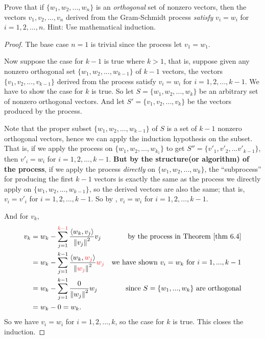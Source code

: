 \begin{exercise} \label{exercise 6.2.8}
Prove that if \(\{ w_1, w_2, ..., w_n \}\) is an \emph{orthogonal} set of nonzero vectors, then the vectors \(v_1, v_2, ..., v_n\) derived from the Gram-Schmidt process \emph{satisfy} \(v_i = w_i\) for \(i = 1, 2, ..., n\).
Hint: Use mathematical induction.
\end{exercise}

\begin{proof}
The base case \(n = 1\) is trivial since the process let \(v_1 = w_1\).

Now suppose the case for \(k - 1\) is true where \(k > 1\), that is, suppose given any nonzero orthogonal set \(\{ w_1, w_2, ..., w_{k - 1} \}\) of \(k - 1\) vectors, the vectors \(\{ v_1, v_2, ..., v_{k - 1} \}\) derived from the process satisfy \(v_i = w_i\) for \(i = 1, 2, ..., k - 1\).
We have to show the case for \(k\) is true.
So let \(S = \{ w_1, w_2, ..., w_k \}\) be an arbitrary set of nonzero orthogonal vectors.
And let \(S' = \{ v_1, v_2, ..., v_k \}\) be the vectors produced by the process.

Note that the proper subset \(\{ w_1, w_2, ..., w_{k - 1} \}\) of \(S\) is a set of \(k - 1\) nonzero orthogonal vectors, hence we can apply the induction hypothesis on the subset.
That is, if we apply the process on \(\{ w_1, w_2, ..., w_{k_1} \}\) to get \(S'' = \{ v'_1, v'_2, ... v'_{k - 1} \}\), then \(v'_i = w_i\) for \(i = 1, 2, ..., k - 1\). 
\textbf{But by the structure(or algorithm) of the process}, if we apply the process \emph{directly} on \(\{ w_1, w_2, ..., w_k \}\), the ``subprocess'' for producing the first \(k - 1\) vectors is exactly the same as the process we directly apply on \(\{ w_1, w_2, ..., w_{k - 1} \}\), so the derived vectors are also the same;
that is, \(v_i = v'_i\) for \(i = 1, 2, ..., k - 1\). 
So by , \(v_i = w_i\) for \(i = 1, 2, ..., k - 1\).

And for \(v_k\),
\begin{align*}
    v_k & = w_k - \sum_{j = 1}^{\RED{k - 1}} \frac{\LG w_k, v_j \RG}{\norm{v_j}^2} v_j & \text{by the process in \THM{6.4}} \\
        & = w_k - \sum_{j = 1}^{k - 1} \frac{\LG w_k, \RED{w_j} \RG}{\norm{\RED{w_j}}^2} \RED{w_j} & \text{we have shown \(v_i = w_k\) for \(i = 1, ..., k - 1\)} \\
        & = w_k - \sum_{j = 1}^{k - 1} \frac{0}{\norm{w_j}^2} w_j & \text{since \(S = \{ w_1, ..., w_k \}\) are orthogonal} \\
        & = w_k - 0 = w_k.
\end{align*}
So we have \(v_i = w_i\) for \(i = 1, 2, ..., k\), so the case for \(k\) is true.
This closes the induction.
\end{proof}


